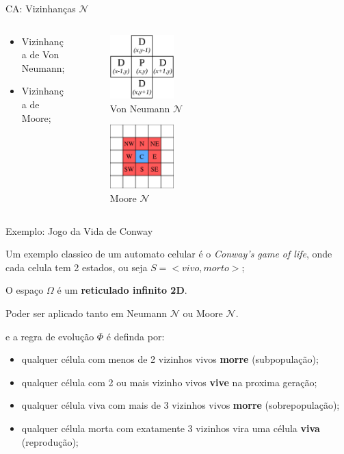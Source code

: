 \documentclass{beamer}
\begin{document}
		\begin{frame}{CA: Vizinhanças $\mathcal{N}$}
			\begin{columns}
				\begin{column}{0.5\textwidth}
					\begin{itemize}
						\item Vizinhança de Von Neumann;
						\item Vizinhança de Moore;
					\end{itemize}
				\end{column}
				\begin{column}{0.5\textwidth}
					\begin{figure}
						\includegraphics[width=0.3\textwidth]{neumann.png}
						\caption{Von Neumann $\mathcal{N}$}
					\end{figure}
				\begin{figure}
					\includegraphics[width=0.3\textwidth]{moore.png}
					\caption{Moore $\mathcal{N}$}
				\end{figure}							
				\end{column}
			\end{columns}
		\end{frame}
		\begin{frame}{Exemplo: Jogo da Vida de Conway}
			\par Um exemplo classico de um automato celular é o \emph{Conway's game of life}, onde cada celula tem 2 estados, ou seja $S = <vivo, morto>$;
			\par O espaço $\Omega$ é um \textbf{reticulado infinito 2D}.
			\par Poder ser aplicado tanto em Neumann $\mathcal{N}$ ou Moore $\mathcal{N}$.
			\par e a regra de evolução $\Phi$ é definda por:
			\begin{itemize}
				\item qualquer célula com menos de 2 vizinhos vivos \textbf{morre} (subpopulação);
				\item qualquer célula com 2 ou mais vizinho vivos \textbf{vive} na proxima geração;
				\item qualquer célula viva com mais de 3 vizinhos vivos \textbf{morre} (sobrepopulação);
				\item qualquer célula morta com exatamente 3 vizinhos vira uma célula \textbf{viva} (reprodução);
			\end{itemize}
		\end{frame}
\end{document}

